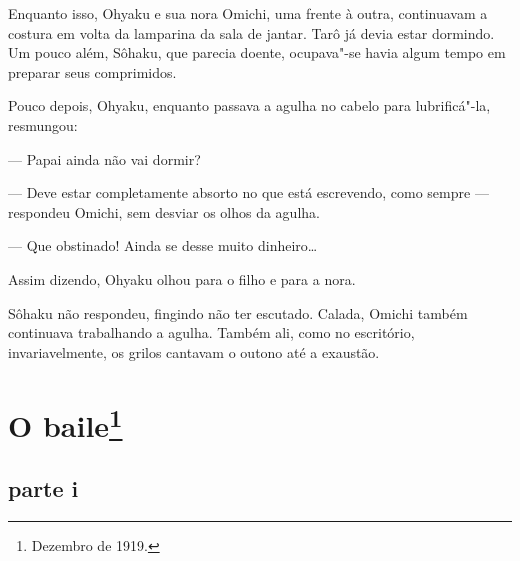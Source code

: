 Enquanto isso, Ohyaku e sua nora Omichi, uma frente à outra, continuavam
a costura em volta da lamparina da sala de jantar. Tarô já devia estar
dormindo. Um pouco além, Sôhaku, que parecia doente, ocupava"-se havia
algum tempo em preparar seus comprimidos.

Pouco depois, Ohyaku, enquanto passava a agulha no cabelo para
lubrificá"-la, resmungou:

--- Papai ainda não vai dormir?

--- Deve estar completamente absorto no que está escrevendo, como sempre 
--- respondeu Omichi, sem desviar os olhos da agulha.

--- Que obstinado! Ainda se desse muito dinheiro\ldots{}

Assim dizendo, Ohyaku olhou para o filho e para a nora. 

Sôhaku não respondeu, fingindo não ter escutado. Calada, Omichi também
continuava trabalhando a agulha. Também ali, como no escritório,
invariavelmente, os grilos cantavam o outono até a exaustão.


\chapter{O baile\footnote{Dezembro de 1919.}}

\section*{parte i}

